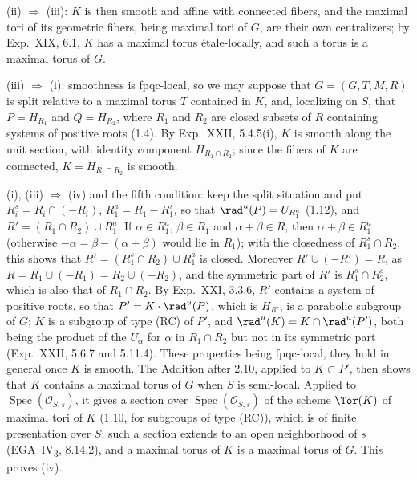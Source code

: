 (ii) \(\Rightarrow\) (iii): \(K\) is then smooth and affine with connected
fibers, and the maximal tori of its geometric fibers, being maximal tori of
\(G\), are their own centralizers; by Exp.~XIX, 6.1, \(K\) has a maximal
torus étale-locally, and such a torus is a maximal torus of \(G\).

(iii) \(\Rightarrow\) (i): smoothness is fpqc-local, so we may suppose that
\(G=(G,T,M,R)\) is split relative to a maximal torus \(T\) contained in
\(K\), and, localizing on \(S\), that \(P=H_{R_1}\) and \(Q=H_{R_2}\), where
\(R_1\) and \(R_2\) are closed subsets of \(R\) containing systems of
positive roots (1.4). By Exp.~XXII, 5.4.5(i), \(K\) is smooth along the unit
section, with identity component \(H_{R_1\cap R_2}\); since the fibers of
\(K\) are connected, \(K=H_{R_1\cap R_2}\) is smooth.

(i), (iii) \(\Rightarrow\) (iv) and the fifth condition: keep the split
situation and put \(R_i^s=R_i\cap(-R_i)\), \(R_1^a=R_1-R_1^s\), so that
\(\rad^u(P)=U_{R_1^a}\) (1.12), and \(R'=(R_1\cap R_2)\cup R_1^a\). If
\(\alpha\in R_1^a\), \(\beta\in R_1\) and \(\alpha+\beta\in R\), then
\(\alpha+\beta\in R_1^a\) (otherwise \(-\alpha=\beta-(\alpha+\beta)\) would
lie in \(R_1\)); with the closedness of \(R_1^s\cap R_2\), this shows that
\(R'=(R_1^s\cap R_2)\cup R_1^a\) is closed. Moreover \(R'\cup(-R')=R\), as
\(R=R_1\cup(-R_1)=R_2\cup(-R_2)\), and the symmetric part of \(R'\) is
\(R_1^s\cap R_2^s\), which is also that of \(R_1\cap R_2\). By Exp.~XXI,
3.3.6, \(R'\) contains a system of positive roots, so that
\(P'=K\cdot\rad^u(P)\), which is \(H_{R'}\), is a parabolic subgroup of
\(G\); \(K\) is a subgroup of type (RC) of \(P'\), and
\(\rad^u(K)=K\cap\rad^u(P')\), both being the product of the \(U_\alpha\)
for \(\alpha\) in \(R_1\cap R_2\) but not in its symmetric part (Exp.~XXII,
5.6.7 and 5.11.4). These properties being fpqc-local, they hold in general
once \(K\) is smooth. The Addition after 2.10, applied to \(K\subset P'\),
then shows that \(K\) contains a maximal torus of \(G\) when \(S\) is
semi-local. Applied to \(\operatorname{Spec}(\mathcal O_{S,s})\), it gives a
section over \(\operatorname{Spec}(\mathcal O_{S,s})\) of the scheme
\(\Tor(K)\) of maximal tori of \(K\) (1.10, for subgroups of type (RC)),
which is of finite presentation over \(S\); such a section extends to an
open neighborhood of \(s\) (EGA~IV\textsubscript{3}, 8.14.2), and a maximal
torus of \(K\) is a maximal torus of \(G\). This proves (iv).

